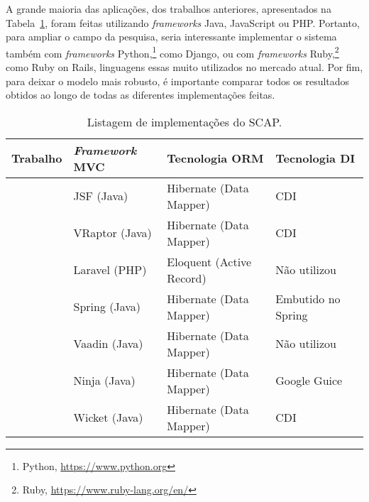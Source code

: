 A grande maioria das aplicações, dos trabalhos anteriores, apresentados na Tabela~\ref*{tbl-comparacao-trabalhos}, foram feitas utilizando \textit{frameworks} Java, JavaScript ou PHP. Portanto, para ampliar
o campo da pesquisa, seria interessante
implementar o sistema também com \textit{frameworks} Python,\footnote{Python, \url{https://www.python.org}} como Django, ou com \textit{frameworks} Ruby,\footnote{Ruby, \url{https://www.ruby-lang.org/en/}} como Ruby on Rails,
linguagens essas muito utilizados no mercado atual.
Por fim, para deixar o modelo mais robusto, é importante comparar todos os resultados obtidos ao longo de todas as diferentes implementações feitas.



\begin{table}[h]
	\caption{Listagem de implementações do SCAP.}
	\label{tbl-comparacao-trabalhos}
	\centering{}
	\begin{tabularx}{\textwidth}{ 
			| >{\hsize=0.4\hsize}X
			| >{\hsize=0.5\hsize}X	
			| >{\hsize=0.7\hsize}X
			| >{\hsize=0.4\hsize}X
			|
		}
		\hline
		\textbf{Trabalho} & 
		\textbf{\textit{Framework} MVC} & 
		\textbf{Tecnologia ORM} &
		\textbf{Tecnologia DI} \\
		\hline
		
		\citeonline{duarte:2014} &
		JSF (Java) & 
		Hibernate (Data Mapper) &
		CDI \\ 
		\hline 
		
		\citeonline{prado:2015} & 
		VRaptor (Java) & 
		Hibernate (Data Mapper) &
		CDI \\
		\hline 
		
		\citeonline{pinheiro:2017} & 
		Laravel (PHP) &
		Eloquent (Active Record)  &
		Não utilizou \\
		\hline
		
		\citeonline{matos:2017} & 
		Spring (Java) &
		Hibernate (Data Mapper)  &
		Embutido no Spring \\
		\hline 
		
		\citeonline{matos:2017} & 
		Vaadin (Java) &
		Hibernate (Data Mapper)  &
		Não utilizou \\
		\hline 
		
		\citeonline{avelar:2018} & 
		Ninja (Java) &
		Hibernate (Data Mapper)  &
		Google Guice \\
		\hline 
		
		\citeonline{ferreira:2018} & 
		Wicket (Java) &
		Hibernate (Data Mapper)  &
		CDI \\ 
		\hline 
		

\end{tabularx}
\end{table}
